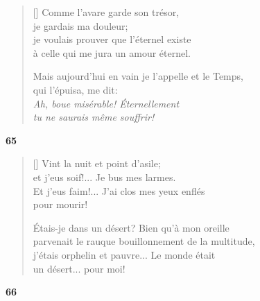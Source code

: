 \documentclass[a4paper,12pt]{book}
\begin{document}
\settowidth{\versewidth}{Mais aujourd'hui en vain je l'appelle et le Temps,}

\begin{verse}[\versewidth]
  Comme l'avare garde son trésor, \\
  je gardais ma douleur; \\
  je voulais prouver que l'éternel existe \\
  à celle qui me jura un amour éternel.

  Mais aujourd'hui en vain je l'appelle et le Temps, \\
  qui l'épuisa, me dit: \\
  \emph{Ah, boue misérable! Éternellement \\
    tu ne saurais même souffrir!}
\end{verse}

\bigskip

\begin{center}
  \textbf{65}
\end{center}

\settowidth{\versewidth}{parvenait le rauque bouillonnement de la multitude,}

\begin{verse}[\versewidth]
  Vint la nuit et point d'asile; \\
  et j'eus soif!... Je bus mes larmes. \\
  Et j'eus faim!... J'ai clos mes yeux enflés \\
  pour mourir!

  Étais-je dans un désert? Bien qu'à mon oreille \\
  parvenait le rauque bouillonnement de la multitude, \\
  j'étais orphelin et pauvre... Le monde était \\
  un désert... pour moi!
\end{verse}

\bigskip

\begin{center}
  \textbf{66}
\end{center}

\settowidth{\versewidth}{des empreintes de pieds ensanglantés}
\end{document}
